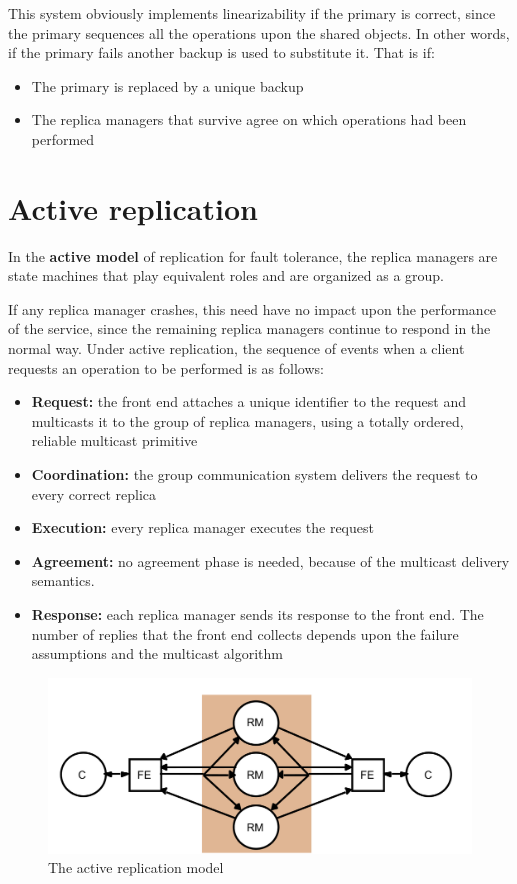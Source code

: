 This system obviously implements linearizability if the primary is correct, since the primary sequences all the operations upon the shared objects. In other words, if the primary fails another backup is used to substitute it. That is if:
\begin{itemize}
    \item The primary is replaced by a unique backup
    \item The replica managers that survive agree on which operations had been performed
\end{itemize}

\section{Active replication}
In the \textbf{active model} of replication for fault tolerance, the replica managers are state machines that play equivalent roles and are organized as a group.

If any replica manager crashes, this need have no impact upon the performance of the service, since the remaining replica managers continue to respond in the normal way. Under active replication, the sequence of events when a client requests an operation to be performed is as follows:
\begin{itemize}
    \item \textbf{Request:} the front end attaches a unique identifier to the request and multicasts it to the group of replica managers, using a totally ordered, reliable multicast primitive
    \item \textbf{Coordination:} the group communication system delivers the request to every correct replica
    \item \textbf{Execution:} every replica manager executes the request
    \item \textbf{Agreement:} no agreement phase is needed, because of the multicast delivery semantics.
    \item \textbf{Response:} each replica manager sends its response to the front end. The number of replies that the front end collects depends upon the failure assumptions and the multicast algorithm
\end{itemize}

\begin{figure}[!h]
    \centering
    \includegraphics[width=.70\linewidth]{images/roleGroupCommunication/ActiveReplication.png}
    \caption{ The active replication model}
\end{figure}

